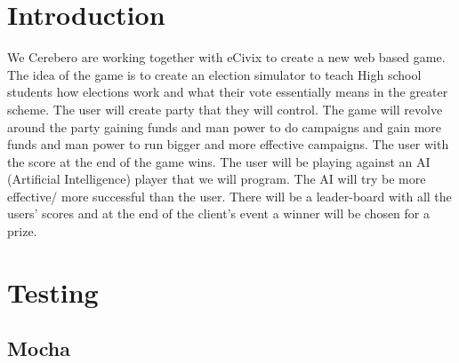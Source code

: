 \documentclass{article}
\begin{document}
  
  

  \tableofcontents
  \newpage

\section{Introduction}
	We Cerebero are working together with eCivix to create a new web based game. The idea of the game is to create an election simulator to teach High school students how elections work and what their vote essentially means in the greater scheme. The user will create party that they will control. The game will revolve around the party gaining funds and man power to do campaigns and gain more funds and man power to run bigger and more effective campaigns. The user with the score at the end of the game wins. The user will be playing against an AI (Artificial Intelligence) player that we will program. The AI will try be more effective/ more successful than the user. There will be a leader-board with all the users' scores and at the end of the client's event a winner will be chosen for a prize. 
	


\section{Testing}
	\subsection{Mocha}
\end{document}
